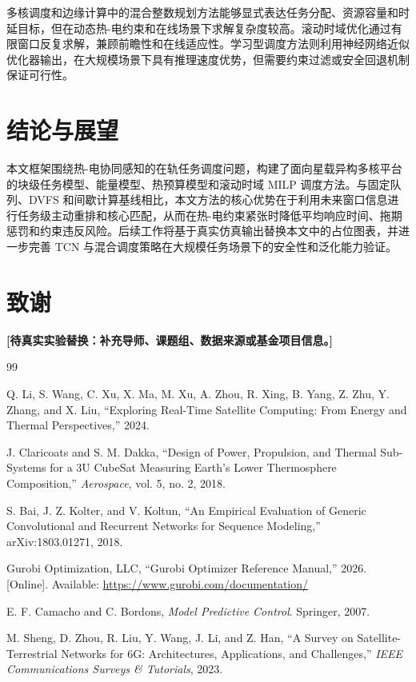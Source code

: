 \documentclass[conference]{IEEEtran}
\newcommand{\todoexp}[1]{\textcolor{placeholder}{\textbf{[待真实实验替换：#1]}}}
\begin{document}
多核调度和边缘计算中的混合整数规划方法能够显式表达任务分配、资源容量和时延目标，但在动态热-电约束和在线场景下求解复杂度较高。滚动时域优化通过有限窗口反复求解，兼顾前瞻性和在线适应性。学习型调度方法则利用神经网络近似优化器输出，在大规模场景下具有推理速度优势，但需要约束过滤或安全回退机制保证可行性。

\section{结论与展望}

本文框架围绕热-电协同感知的在轨任务调度问题，构建了面向星载异构多核平台的块级任务模型、能量模型、热预算模型和滚动时域 MILP 调度方法。与固定队列、DVFS 和间歇计算基线相比，本文方法的核心优势在于利用未来窗口信息进行任务级主动重排和核心匹配，从而在热-电约束紧张时降低平均响应时间、拖期惩罚和约束违反风险。后续工作将基于真实仿真输出替换本文中的占位图表，并进一步完善 TCN 与混合调度策略在大规模任务场景下的安全性和泛化能力验证。

\section*{致谢}

\todoexp{补充导师、课题组、数据来源或基金项目信息。}

\begin{thebibliography}{99}

Q. Li, S. Wang, C. Xu, X. Ma, M. Xu, A. Zhou, R. Xing, B. Yang, Z. Zhu, Y. Zhang, and X. Liu,
``Exploring Real-Time Satellite Computing: From Energy and Thermal Perspectives,''
2024.

J. Claricoats and S. M. Dakka,
``Design of Power, Propulsion, and Thermal Sub-Systems for a 3U CubeSat Measuring Earth's Lower Thermosphere Composition,''
\emph{Aerospace}, vol. 5, no. 2, 2018.

S. Bai, J. Z. Kolter, and V. Koltun,
``An Empirical Evaluation of Generic Convolutional and Recurrent Networks for Sequence Modeling,''
arXiv:1803.01271, 2018.

Gurobi Optimization, LLC,
``Gurobi Optimizer Reference Manual,''
2026. [Online]. Available: \url{https://www.gurobi.com/documentation/}

E. F. Camacho and C. Bordons,
\emph{Model Predictive Control}.
Springer, 2007.

M. Sheng, D. Zhou, R. Liu, Y. Wang, J. Li, and Z. Han,
``A Survey on Satellite-Terrestrial Networks for 6G: Architectures, Applications, and Challenges,''
\emph{IEEE Communications Surveys \& Tutorials}, 2023.

\end{thebibliography}
\end{document}
